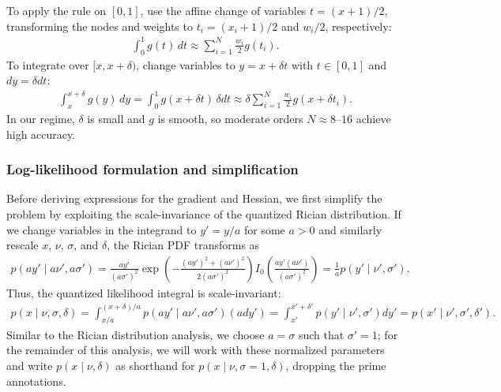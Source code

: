 \documentclass{article}
\begin{document}
To apply the rule on $[0,1]$, use the affine change of variables $t = (x+1)/2$, transforming the nodes and weights to $t_i = (x_i+1)/2$ and $w_i/2$, respectively:
%
\begin{align}
  \int_{0}^{1} g(t) \, dt \approx \sum_{i=1}^{N} \frac{w_i}{2} g(t_i).
\end{align}
%
To integrate over $[x, x + \delta)$, change variables to $y = x + \delta t$ with $t\in[0,1]$ and $dy = \delta dt$:
%
\begin{align}
  \int_{x}^{x + \delta} g(y) \, dy = \int_{0}^{1} g(x + \delta t) \, \delta dt
  \approx \delta \sum_{i=1}^{N} \frac{w_i}{2} g(x + \delta t_i).
\end{align}
%
In our regime, $\delta$ is small and $g$ is smooth, so moderate orders $N \approx 8\text{--}16$ achieve high accuracy.

\subsubsection{Log-likelihood formulation and simplification}

Before deriving expressions for the gradient and Hessian, we first simplify the problem by exploiting the scale-invariance of the quantized Rician distribution.
If we change variables in the integrand to $y' = y / a$ for some $a > 0$ and similarly rescale $x$, $\nu$, $\sigma$, and $\delta$, the Rician PDF transforms as
%
\begin{align}
  p(a y' \mid a \nu', a \sigma')
  = \frac{a y'}{(a \sigma')^2} \exp\left(-\frac{(a y')^2+(a \nu')^2}{2(a \sigma')^2}\right) I_0\left(\frac{a y' (a \nu')}{(a \sigma')^2}\right)
  = \frac{1}{a} p(y' \mid \nu', \sigma').
\end{align}
%
Thus, the quantized likelihood integral is scale-invariant:
%
\begin{align}
  p(x \mid \nu, \sigma, \delta)
  = \int_{x/a}^{(x + \delta)/a} p(a y' \mid a\nu', a\sigma') (a dy') = \int_{x'}^{x'+\delta'} p(y' \mid \nu', \sigma') dy'
  = p(x' \mid \nu', \sigma', \delta').
\end{align}
%
Similar to the Rician distribution analysis, we choose $a = \sigma$ such that $\sigma'=1$;
for the remainder of this analysis, we will work with these normalized parameters and write $p(x \mid \nu, \delta)$ as shorthand for $p(x \mid \nu, \sigma=1, \delta)$, dropping the prime annotations.
\end{document}
